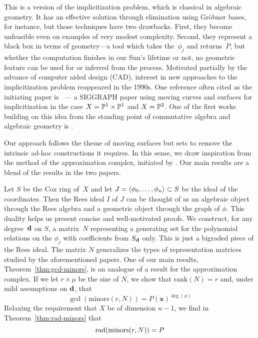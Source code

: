 \documentclass[fleqn,reqno]{amsart}
\begin{document}
\begin{paragraf*}
This is a version of the implicitization problem, which is classical in algebraic geometry.
It has an effective solution through elimination using Gr\"obner bases, for instance,
but those techniques have two drawbacks.
First, they become unfeasible even on examples of very modest complexity.
Second, they represent a black box in terms of geometry---a tool which
takes the~$\phi_j$ and returns~$P$,
but whether the computation finishes in our Sun's lifetime or not,
no geometric feature can be used for or inferred from the process.
Motivated partially by the advance of computer aided design (CAD),
interest in new approaches to the implicitization problem
reappeared in the 1990s.
One reference often cited as the initiating paper is \cite{SC-95}~---
a SIGGRAPH paper using moving curves and surfaces for implicitization
in the case $X=\mathbb{P}^1\times\mathbb{P}^1$ and $X=\mathbb{P}^2$.
One of the first works building on this idea from the standing point
of commutative algebra and algebraic geometry is \citet{CGZ-00}.
\end{paragraf*}

\begin{paragraf*}
Our approach follows the theme of moving surfaces but sets to remove the intrinsic
ad-hoc constructions it requires.
In this sense,
we draw inspiration from the method of the approximation complex,
initiated by \citet{BJ-03}.
Our main results are a blend of the results in the two papers.

Let $S$ be the Cox ring of~$X$ and
let $J=\langle\phi_0,\ldots,\phi_n\rangle\subset S$ be the ideal of the coordinates.
Then the Rees ideal $I$ of $J$ can be thought of as
an algebraic object through the Rees algebra and
a geometric object through the graph of $\phi$.
This duality helps us present concise and well-motivated proofs.
We construct, for any degree~$\mathbf d$ on $S$,
a matrix~$N$ representing a generating set for the polynomial relations on the $\phi_j$
with coefficients from $S_\mathbf d$ only.
This is just a bigraded piece of the Rees ideal.
The matrix $N$ generalizes the types of representation matrices
studied by the aforementioned papers.
One of our main results, Theorem~\ref{thm:gcd-minors},
is an analogue of a result for the approximation complex.
If we let $r\times\mu$ be the size of $N$,
we show that $\text{rank}(N)=r$ and,
under mild assumptions on $\mathbf d$, that
\[
	\gcd(\text{minors}(r,N))=P(\mathbf x)^{\deg(\phi)}
\]
Relaxing the requirement that $X$ be of dimension $n-1$,
we find in Theorem~\ref{thm:rad-minors} that
\[
	\operatorname{rad}(\text{minors}(r,N))=P
\]
\end{paragraf*}
\end{document}
